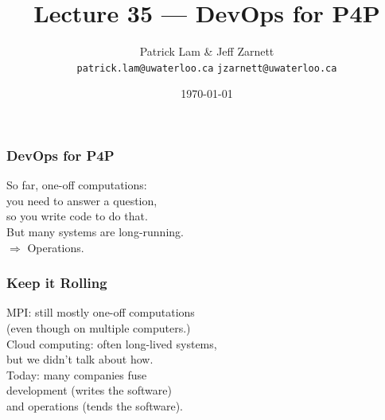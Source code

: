

\title{Lecture 35 --- DevOps for P4P }

\author{Patrick Lam \& Jeff Zarnett \\ \small \texttt{patrick.lam@uwaterloo.ca} \texttt{jzarnett@uwaterloo.ca}}
\date{\today}




\begin{frame}
  \titlepage

 \end{frame}



\begin{frame}
\frametitle{DevOps for P4P}

\Large
\begin{changemargin}{2cm}
So far, one-off computations:\\
you need to answer a question, \\
so you write code to
do that.\\[1em]
But many systems are long-running.\\[1em]
$\Rightarrow$ Operations.
\end{changemargin}

\end{frame}



\begin{frame}
\frametitle{Keep it Rolling}

\Large
\begin{changemargin}{1cm}
MPI: still mostly one-off computations\\
(even though on multiple computers.)\\[1em]
Cloud computing: often long-lived systems,\\
but we didn't talk about how.\\[1em]
Today: many companies fuse\\
development (writes the software) \\
and operations (tends the software).
\end{changemargin}
\end{frame}



